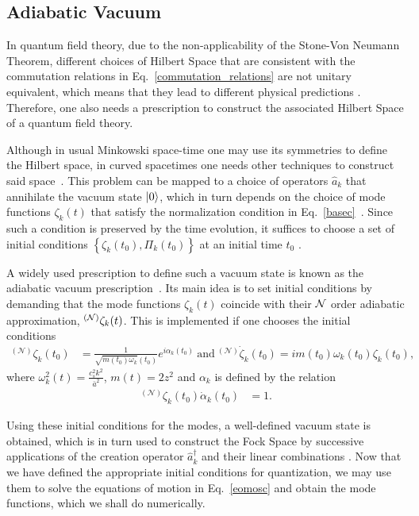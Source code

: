 \documentclass[a4paper,11pt]{article}
\newcommand{\dcha}[1]{\left\{#1 \right\}}
\begin{document}
\subsection{Adiabatic Vacuum}

In quantum field theory, due to the non-applicability of the Stone-Von Neumann Theorem, different choices of Hilbert Space that are consistent with the commutation relations in Eq.~\eqref{commutation_relations} are not unitary equivalent, which means that they lead to different physical predictions \cite{wald1994quantum}. Therefore, one also needs a prescription to construct the associated Hilbert Space of a quantum field theory. 

Although in usual Minkowski space-time one may use its symmetries to define the Hilbert space, in curved spacetimes one needs other techniques to construct said space~\cite{birrell1984quantum}. This problem can be mapped to a choice of operators $\hat{a}_{k}$ that annihilate the vacuum state $\ket{0}$, which in turn depends on the choice of mode functions $\zeta_{k}(t)$ that satisfy the normalization condition in Eq.~\eqref{basec}~\cite{mukhanov2007introduction}. Since such a condition is preserved by the time evolution, it suffices to choose a set of initial conditions $\dcha{\zeta_{k}(t_{0}), \Pi_{k}(t_{0})}$ at an initial time $t_{0}$ \cite{vacuum2022}.

A widely used prescription to define such a vacuum state is known as the adiabatic vacuum prescription~\cite{birrell1984quantum,mukhanov2007introduction}. Its main idea is to set initial conditions by demanding that the mode functions $\zeta_{k}(t)$ coincide with their ${\cal N}$ order adiabatic approximation, $^{({\cal N})}\zeta_{k}(t)$. This is implemented if one chooses the initial conditions~\cite{birrell1984quantum}
%
\begin{align}
	\label{v_init}
	{ }^{(\mathcal{N})}	\zeta_k(t_0) &= \frac{1}{\sqrt{m(t_0)\omega_k}(t_0)}e^{i\alpha_k(t_0)}~\text{and}~ { }^{(\mathcal{N})}	\dot{\zeta}_k(t_0) = im(t_0)\omega_k(t_0)\zeta_k(t_0)
	,\end{align}
where $\omega_k^2(t) = \frac{c_s^2 k^2}{\bar{a}^2}$, $m(t) = 2z^2$ and $\alpha_k$ is defined by the relation
\begin{align}
	{ }^{(\mathcal{N})}	\zeta_k(t_0) \dot{\alpha}_k(t_0) &= 1.
\end{align}

Using these initial conditions for the modes, a well-defined vacuum state is obtained, which is in turn used to construct the Fock Space by successive applications of the creation operator $\hat{a}^{\dagger}_{k}$ and their linear combinations \cite{mukhanov2007introduction}. Now that we have defined the appropriate initial conditions for quantization, we may use them to solve the equations of motion in Eq.~\eqref{eomosc} and obtain the mode functions, which we shall do numerically.
\end{document}

